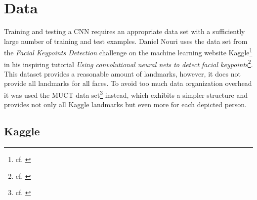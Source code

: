 \documentclass[11pt, a4paper]{article}
\begin{document}
\section{Data}

Training and testing a \ac{CNN} requires an appropriate data set with a sufficiently large number of training and test examples. Daniel Nouri uses the data set from the \emph{Facial Keypoints Detection} challenge on the machine learning website Kaggle\footnote{cf. \cite{kaggle}} in his inspiring tutorial \emph{Using convolutional neural nets to detect facial keypoints}\footnote{cf. \cite{nouri-tutorial}}. This dataset provides a reasonable amount of landmarks, however, it does not provide all landmarks for all faces. To avoid too much data organization overhead it was used the \ac{MUCT} data set\footnote{cf. \cite{muct}} instead, which exhibits a simpler structure and provides not only all Kaggle landmarks but even more for each depicted person.

\subsection{Kaggle}
\end{document}
